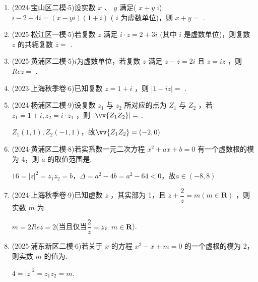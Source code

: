 \begin{enumerate}
    \item (2024$\cdot$宝山区二模$\cdot$5)设实数 $x$ 、 $y$ 满足( $x + y$ i) $i - 2 + 4{i} = \left( {x - y{i}}\right) \left( {1 + {i}}\right)$ ( ${i}$ 为虚数单位)，则 $x + y =$ .

    \item (2025$\cdot$松江区一模$\cdot$5)若复数 $z$ 满足 ${i} \cdot  z = 2 + 3{i}$ (其中 ${i}$ 是虚数单位)，则复数 $z$ 的共轭复数 $\overline{z} =$ .

    \item (2025$\cdot$黄浦区二模$\cdot$5)$i$为虚数单位，若复数 $z$ 满足 $z - \overline{z} = 2{i}$ 且 $\overline{z} = {i}z$ ，则 ${Re}z =$ .

    \item (2023$\cdot$上海秋季卷$\cdot$6)已知复数 $z = 1 + {i}$ ，则 $\left| {1 - {i}z}\right|  =$ .

    \item (2024$\cdot$杨浦区二模$\cdot$9)设复数 ${z}_{1}$ 与 ${z}_{2}$ 所对应的点为 ${Z}_{1}$ 与 ${Z}_{2}$ ，若 ${z}_{1} = 1 + {i},{z}_{2} = {i} \cdot  {z}_{1}$ ，则 $\left| \vv{{Z}_{1}{Z}_{2}}\right|  =$ .
    \begin{jieda}
        $Z_1(1, 1), Z_2(-1, 1)$，故$ \vv{{Z}_{1}{Z}_{2}} = (-2, 0)$
    \end{jieda}

    \item (2024$\cdot$黄浦区二模$\cdot$8)若实系数一元二次方程 ${x}^{2} + {ax} + b = 0$ 有一个虚数根的模为 4，则 $a$ 的取值范围是.
    \begin{jieda}
        $16 = \left|z\right|^2 = z_1z_2 = b$，$\Delta = a^2 - 4b = a^2 - 64 < 0$，故$a \in (-8, 8)$
    \end{jieda}

    \item (2024$\cdot$上海秋季卷$\cdot$9)已知虚数 $z$ ，其实部为 1，且 $z + \dfrac{2}{z} = m\left( {m \in  \mathbf{R}}\right)$ ，则实数 $m$ 为.
    \begin{jieda}
        $m = 2Rez = 2$(当且仅当$\dfrac{2}{z} = \overline{z}$，$m \in \mathbf{R}$).
    \end{jieda}

    \item (2025$\cdot$浦东新区二模$\cdot$6)若关于 $x$ 的方程 ${x}^{2} - x + m = 0$ 的一个虚根的模为 2，则实数 $m$ 的值为.
    \begin{jieda}
        $4 = \left|z\right|^2 = z_1z_2 = m$.
    \end{jieda}


\end{enumerate}
